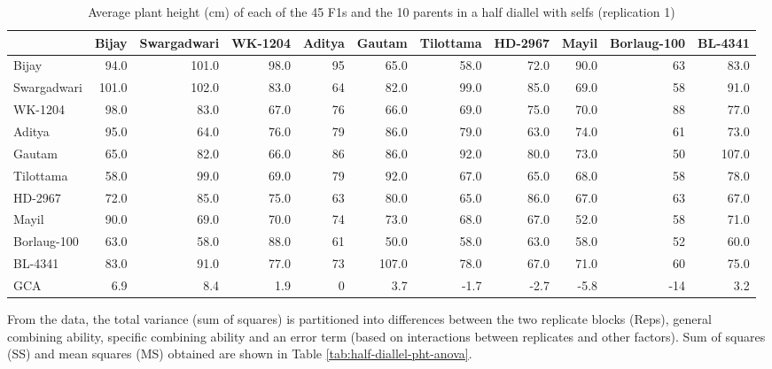 \documentclass[nofonts,]{tufte-handout}
\begin{document}
\begin{longtable}{lrrrrrrrrrr}
\caption{\label{tab:half-diallel-pht}Average plant height (cm) of each of the 45 F1s and the 10 parents in a half diallel with selfs (replication 1)}\\
\toprule
  & Bijay & Swargadwari & WK-1204 & Aditya & Gautam & Tilottama & HD-2967 & Mayil & Borlaug-100 & BL-4341\\
\midrule
Bijay & 94.0 & 101.0 & 98.0 & 95 & 65.0 & 58.0 & 72.0 & 90.0 & 63 & 83.0\\
Swargadwari & 101.0 & 102.0 & 83.0 & 64 & 82.0 & 99.0 & 85.0 & 69.0 & 58 & 91.0\\
WK-1204 & 98.0 & 83.0 & 67.0 & 76 & 66.0 & 69.0 & 75.0 & 70.0 & 88 & 77.0\\
Aditya & 95.0 & 64.0 & 76.0 & 79 & 86.0 & 79.0 & 63.0 & 74.0 & 61 & 73.0\\
Gautam & 65.0 & 82.0 & 66.0 & 86 & 86.0 & 92.0 & 80.0 & 73.0 & 50 & 107.0\\
\addlinespace
Tilottama & 58.0 & 99.0 & 69.0 & 79 & 92.0 & 67.0 & 65.0 & 68.0 & 58 & 78.0\\
HD-2967 & 72.0 & 85.0 & 75.0 & 63 & 80.0 & 65.0 & 86.0 & 67.0 & 63 & 67.0\\
Mayil & 90.0 & 69.0 & 70.0 & 74 & 73.0 & 68.0 & 67.0 & 52.0 & 58 & 71.0\\
Borlaug-100 & 63.0 & 58.0 & 88.0 & 61 & 50.0 & 58.0 & 63.0 & 58.0 & 52 & 60.0\\
BL-4341 & 83.0 & 91.0 & 77.0 & 73 & 107.0 & 78.0 & 67.0 & 71.0 & 60 & 75.0\\
\addlinespace
GCA & 6.9 & 8.4 & 1.9 & 0 & 3.7 & -1.7 & -2.7 & -5.8 & -14 & 3.2\\
\bottomrule
\end{longtable}

From the data, the total variance (sum of squares) is partitioned into
differences between the two replicate blocks (Reps), general combining
ability, specific combining ability and an error term (based on
interactions between replicates and other factors). Sum of squares (SS)
and mean squares (MS) obtained are shown in Table
\ref{tab:half-diallel-pht-anova}.
\end{document}
